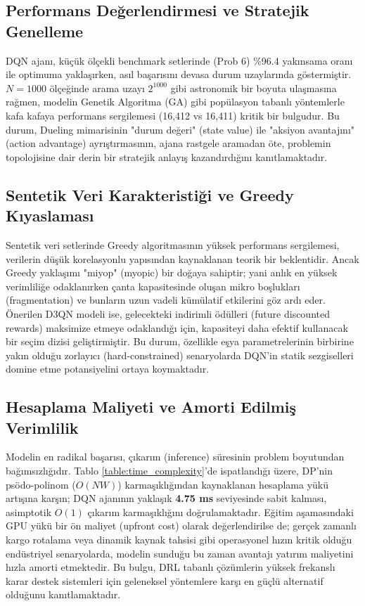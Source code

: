 \documentclass[conference]{IEEEtran}
\begin{document}
\subsection{Performans Değerlendirmesi ve Stratejik Genelleme}
DQN ajanı, küçük ölçekli benchmark setlerinde (Prob 6) \%96.4 yakınsama oranı ile optimuma yaklaşırken, asıl başarısını devasa durum uzaylarında göstermiştir. $N=1000$ ölçeğinde arama uzayı $2^{1000}$ gibi astronomik bir boyuta ulaşmasına rağmen, modelin Genetik Algoritma (GA) gibi popülasyon tabanlı yöntemlerle kafa kafaya performans sergilemesi (16,412 vs 16,411) kritik bir bulgudur. Bu durum, Dueling mimarisinin "durum değeri" (state value) ile "aksiyon avantajını" (action advantage) ayrıştırmasının, ajana rastgele aramadan öte, problemin topolojisine dair derin bir stratejik anlayış kazandırdığını kanıtlamaktadır.

\subsection{Sentetik Veri Karakteristiği ve Greedy Kıyaslaması}
Sentetik veri setlerinde Greedy algoritmasının yüksek performans sergilemesi, verilerin düşük korelasyonlu yapısından kaynaklanan teorik bir beklentidir. Ancak Greedy yaklaşımı "miyop" (myopic) bir doğaya sahiptir; yani anlık en yüksek verimliliğe odaklanırken çanta kapasitesinde oluşan mikro boşlukları (fragmentation) ve bunların uzun vadeli kümülatif etkilerini göz ardı eder. Önerilen D3QN modeli ise, gelecekteki indirimli ödülleri (future discounted rewards) maksimize etmeye odaklandığı için, kapasiteyi daha efektif kullanacak bir seçim dizisi geliştirmiştir. Bu durum, özellikle eşya parametrelerinin birbirine yakın olduğu zorlayıcı (hard-constrained) senaryolarda DQN'in statik sezgiselleri domine etme potansiyelini ortaya koymaktadır.

\subsection{Hesaplama Maliyeti ve Amorti Edilmiş Verimlilik}
Modelin en radikal başarısı, çıkarım (inference) süresinin problem boyutundan bağımsızlığıdır. Tablo \ref{table:time_complexity}'de ispatlandığı üzere, DP'nin psödo-polinom ($O(NW)$) karmaşıklığından kaynaklanan hesaplama yükü artışına karşın; DQN ajanının yaklaşık \textbf{4.75 ms} seviyesinde sabit kalması, asimptotik $O(1)$ çıkarım karmaşıklığını doğrulamaktadır. Eğitim aşamasındaki GPU yükü bir ön maliyet (upfront cost) olarak değerlendirilse de; gerçek zamanlı kargo rotalama veya dinamik kaynak tahsisi gibi operasyonel hızın kritik olduğu endüstriyel senaryolarda, modelin sunduğu bu zaman avantajı yatırım maliyetini hızla amorti etmektedir. Bu bulgu, DRL tabanlı çözümlerin yüksek frekanslı karar destek sistemleri için geleneksel yöntemlere karşı en güçlü alternatif olduğunu kanıtlamaktadır.
\end{document}
